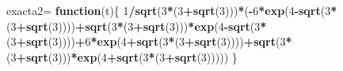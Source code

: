 \documentclass[]{article}
\newenvironment{Shaded}{\begin{snugshade}}{\end{snugshade}}
\newcommand{\KeywordTok}[1]{\textcolor[rgb]{0.13,0.29,0.53}{\textbf{#1}}}
\newcommand{\DecValTok}[1]{\textcolor[rgb]{0.00,0.00,0.81}{#1}}
\newcommand{\StringTok}[1]{\textcolor[rgb]{0.31,0.60,0.02}{#1}}
\newcommand{\ControlFlowTok}[1]{\textcolor[rgb]{0.13,0.29,0.53}{\textbf{#1}}}
\newcommand{\OperatorTok}[1]{\textcolor[rgb]{0.81,0.36,0.00}{\textbf{#1}}}
\newcommand{\NormalTok}[1]{#1}
\begin{document}
\begin{Shaded}
\begin{Highlighting}[]
\NormalTok{exacta2=}\StringTok{ }\ControlFlowTok{function}\NormalTok{(t)\{}
  \DecValTok{1}\OperatorTok{/}\KeywordTok{sqrt}\NormalTok{(}\DecValTok{3}\OperatorTok{*}\NormalTok{(}\DecValTok{3}\OperatorTok{+}\KeywordTok{sqrt}\NormalTok{(}\DecValTok{3}\NormalTok{)))}\OperatorTok{*}\NormalTok{(}\OperatorTok{-}\DecValTok{6}\OperatorTok{*}\KeywordTok{exp}\NormalTok{(}\DecValTok{4}\OperatorTok{-}\KeywordTok{sqrt}\NormalTok{(}\DecValTok{3}\OperatorTok{*}\NormalTok{(}\DecValTok{3}\OperatorTok{+}\KeywordTok{sqrt}\NormalTok{(}\DecValTok{3}\NormalTok{))))}\OperatorTok{+}\KeywordTok{sqrt}\NormalTok{(}\DecValTok{3}\OperatorTok{*}\NormalTok{(}\DecValTok{3}\OperatorTok{+}\KeywordTok{sqrt}\NormalTok{(}\DecValTok{3}\NormalTok{)))}\OperatorTok{*}\KeywordTok{exp}\NormalTok{(}\DecValTok{4}\OperatorTok{-}\KeywordTok{sqrt}\NormalTok{(}\DecValTok{3}\OperatorTok{*}\NormalTok{(}\DecValTok{3}\OperatorTok{+}\KeywordTok{sqrt}\NormalTok{(}\DecValTok{3}\NormalTok{))))}\OperatorTok{+}\DecValTok{6}\OperatorTok{*}\KeywordTok{exp}\NormalTok{(}\DecValTok{4}\OperatorTok{+}\KeywordTok{sqrt}\NormalTok{(}\DecValTok{3}\OperatorTok{*}\NormalTok{(}\DecValTok{3}\OperatorTok{+}\KeywordTok{sqrt}\NormalTok{(}\DecValTok{3}\NormalTok{))))}\OperatorTok{+}\KeywordTok{sqrt}\NormalTok{(}\DecValTok{3}\OperatorTok{*}\NormalTok{(}\DecValTok{3}\OperatorTok{+}\KeywordTok{sqrt}\NormalTok{(}\DecValTok{3}\NormalTok{)))}\OperatorTok{*}\KeywordTok{exp}\NormalTok{(}\DecValTok{4}\OperatorTok{+}\KeywordTok{sqrt}\NormalTok{(}\DecValTok{3}\OperatorTok{*}\NormalTok{(}\DecValTok{3}\OperatorTok{+}\KeywordTok{sqrt}\NormalTok{(}\DecValTok{3}\NormalTok{)))))}
\NormalTok{\}}
\end{Highlighting}
\end{Shaded}
\end{document}
